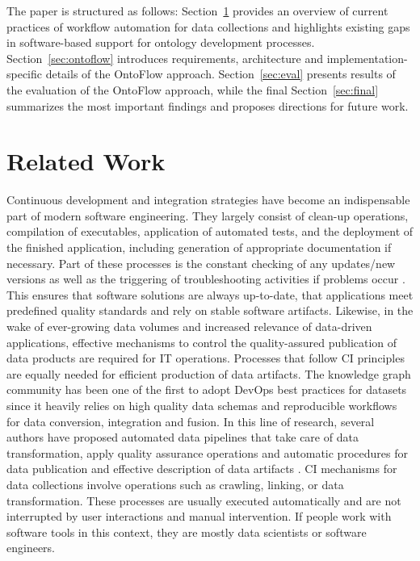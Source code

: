 \documentclass[runningheads]{llncs}
\begin{document}
The paper is structured as follows: Section~\ref{sec:related} provides an overview of current practices of workflow automation for data collections and highlights existing gaps in software-based support for ontology development processes. Section~\ref{sec:ontoflow} introduces requirements, architecture and implementation-specific details of the OntoFlow approach. Section~\ref{sec:eval} presents results of the evaluation of the OntoFlow approach, while the final Section~\ref{sec:final} summarizes the most important findings and proposes directions for future work.
\section{Related Work}
\label{sec:related}
Continuous development and integration strategies have become an indispensable part of modern software engineering.
They largely consist of clean-up operations, compilation of executables, application of automated tests, and the deployment of the finished application, including generation of appropriate documentation if necessary. Part of these processes is the constant checking of any updates/new versions as well as the triggering of troubleshooting activities if problems occur \cite{fowler}.
This ensures that software solutions are always up-to-date, that applications meet predefined quality standards and rely on stable software artifacts. Likewise, in the wake of ever-growing data volumes and increased relevance of data-driven applications, effective mechanisms to control the quality-assured publication of data products are required for IT operations. Processes that follow CI principles are equally needed for efficient production of data artifacts. The knowledge graph community has been one of the first to adopt DevOps best practices for datasets since it heavily relies on high quality data schemas and reproducible workflows for data conversion, integration and fusion. In this line of research, several authors have proposed automated data pipelines that take care of data transformation, apply quality assurance operations and automatic procedures for data publication and effective description of data artifacts
\cite{cirulli,klimek,kucera,meissner,rojas,roman,stadler,dataid}. CI mechanisms for data collections involve operations such as crawling, linking, or data transformation. These processes are usually executed automatically and are not interrupted by user interactions and manual intervention. If people work with software tools in this context, they are mostly data scientists or software engineers.\\
\end{document}
